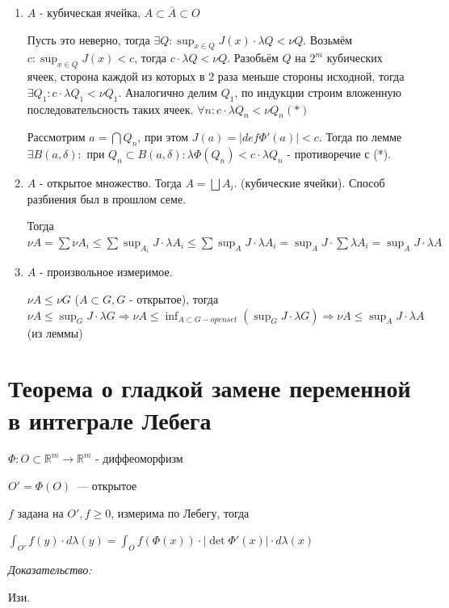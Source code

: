 \documentclass[paper=a4, fontsize=17pt]{article}
\begin{document}
\begin{enumerate}
	\item $A$ - кубическая ячейка, $A \subset \overline{A} \subset O$
	
	Пусть это неверно, тогда $\exists Q: \sup_{x \in Q} J(x) \cdot \lambda Q < \nu Q$. Возьмём $c:  \sup_{x \in Q} J(x) < c$, тогда $c \cdot \lambda Q < \nu Q$. Разобьём $Q$ на $2^m$ кубических ячеек, сторона каждой из которых в 2 раза меньше стороны исходной, тогда $\exists Q_1: c \cdot \lambda Q_1 < \nu Q_1$. Аналогично делим $Q_1$, по индукции строим вложенную последовательсность таких ячеек. $\forall n: c \cdot \lambda Q_n < \nu Q_n (*)$
	
	Рассмотрим $a = \bigcap Q_n$, при этом $J(a) = |def \Phi'(a)| < c$. Тогда по лемме $\exists B(a, \delta):$ при $Q_n \subset B(a, \delta): \lambda \Phi(Q_n) < c \cdot \lambda Q_n$ - противоречие с (*).
	
	\item $A$ - открытое множество. Тогда $A = \bigsqcup A_i$. (кубические ячейки). Способ разбиения был в прошлом семе.
	
	Тогда $\nu A = \sum \nu A_i \leqslant \sum \sup_{A_i} J \cdot  \lambda A_i \leqslant \sum \sup_{A} J \cdot \lambda A_i = \sup_{A} J \cdot \sum \lambda A_i = \sup_{A} J \cdot  \lambda A$ 
	
	\item $A$ - произвольное измеримое.
	
	$\nu A \leqslant \nu G$ ($A \subset G, G$ - открытое), тогда $\nu A \leqslant \sup_G J \cdot \lambda G \Rightarrow \nu A \leqslant \inf_{A \subset G - open set}(\sup_G J \cdot \lambda G) \Rightarrow \nu A \leqslant \sup_A J \cdot \lambda A$ (из леммы)
	
\end{enumerate}

\section{Теорема о гладкой замене переменной в интеграле Лебега}
$\Phi: O \subset \mathds{R}^m \rightarrow \mathds{R}^m$ - диффеоморфизм

$O' = \Phi(O)$~--- открытое

$f$ задана на $O', f \geqslant 0$, измерима по Лебегу, тогда

$\int_{O'}f(y) \cdot d \lambda(y) = \int_O f(\Phi(x)) \cdot |\det \Phi'(x)| \cdot d \lambda(x)$

\emph{Доказательство:}

Изи.
\end{document}
